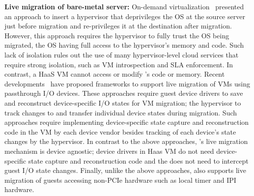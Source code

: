 {\bf Live migration of bare-metal server:} 
On-demand virtualization~\cite{ondemand} presented an approach
to insert a hypervisor that deprivileges the OS at the 
source server just before migration and re-privileges it
at the destination after migration. However, this approach 
requires the hypervisor to fully trust the OS being migrated, 
the OS having full access to the hypervisor's memory and code.
Such lack of isolation rules out the use of many hypervisor-level
cloud services that require strong isolation, such as VM introspection
and SLA enforcement. In contrast, a HaaS VM 
cannot access or modify \sna's code or memory.
Recent developments~\cite{vfio-live-migration,blmvisor-journal} 
have proposed frameworks to support live migration 
of VMs using passthrough I/O devices. These approaches 
require guest device drivers to save and reconstruct device-specific 
I/O states for VM migration; the hypervisor to track changes to
and transfer individual device states during migration.
Such approaches require
implementing device-specific state capture and reconstruction code 
in the VM by each device vendor besides tracking of each device's
state changes by the hypervisor. 
In contrast to the above approaches, 
\sna's live migration mechanism is device agnostic; 
device drivers in Haas VM do not need
device-specific state capture and reconstruction code 
and the \na does not need to intercept guest I/O state changes.
Finally, unlike the above approaches,
\na also supports live migration of guests accessing non-PCIe 
hardware such as local timer and IPI hardware.


